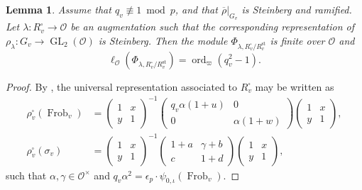 \documentclass[a4paper, notitlepage, 10pt]{amsart}
\theoremstyle{plain} %
\newtheorem{lemma}[theorem]{Lemma}
\theoremstyle{definition} %
\theoremstyle{remark} %
\numberwithin{equation}{section}
\newcommand{\GL}{\operatorname{GL}} %
\newcommand{\Frob}{\operatorname{Frob}} %
\newcommand{\ord}{\operatorname{ord}} %
\newcommand{\st}{\operatorname{st}}
\begin{document}
\begin{lemma}\label{cotangentsquare2}
   Assume that $q_v\not\equiv 1\bmod p$, and that $\overline{{\rho}}|_{G_v}$ is Steinberg and ramified. Let $\lambda\colon R^{\square}_v\to \mathcal{O}$ be an augmentation such that the corresponding representation of $\rho_\lambda\colon G_v\to \GL_2(\mathcal{O})$ is Steinberg. Then the module $\Phi_{\lambda,R^{\square}_v/R_{v}^{\st}}$ is finite over $\mathcal{O}$ and $$ \ell_{\mathcal{O}}(\Phi_{\lambda,R^{\square}_v/R_{v}^{\st}})=\ord_{\varpi}(q_v^2-1).$$ 
    \end{lemma}
\begin{proof}
    By \cite[Lemma 5.4]{Sho16}, the universal representation associated to $R_v^\square$ may be written as 
    \begin{align*}
        \rho_v^{\square}(\Frob_v) &= \begin{pmatrix}
            1 & x \\ y & 1
        \end{pmatrix}^{-1} \begin{pmatrix}
            q_v \alpha (1+u) & 0
            \\ 0 & \alpha (1+w)
        \end{pmatrix} \begin{pmatrix}
            1 & x \\ y & 1
        \end{pmatrix},
        \\ \rho_v^{\square}(\sigma_v) &=  \begin{pmatrix}
            1 & x \\ y & 1
        \end{pmatrix}^{-1} \begin{pmatrix}
            1+a & \gamma+ b
            \\ c & 1+d
        \end{pmatrix} \begin{pmatrix}
            1 & x \\ y & 1
        \end{pmatrix},
    \end{align*}
such that $\alpha,\gamma\in \mathcal{O}^\times$ and $q_v\alpha^2=\epsilon_p\cdot\psi_{0,\iota}(\Frob_v)$. 


\end{proof}
\end{document}

